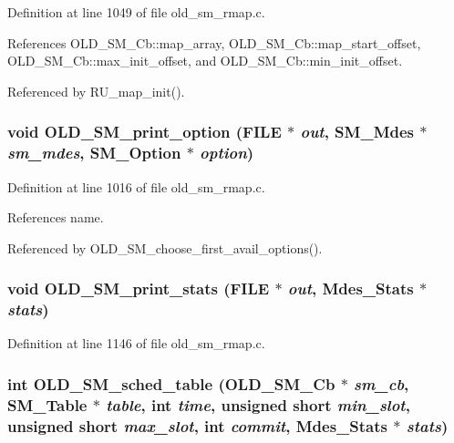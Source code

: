 Definition at line 1049 of file old\_\-sm\_\-rmap.c.

References OLD\_\-SM\_\-Cb::map\_\-array, OLD\_\-SM\_\-Cb::map\_\-start\_\-offset, OLD\_\-SM\_\-Cb::max\_\-init\_\-offset, and OLD\_\-SM\_\-Cb::min\_\-init\_\-offset.

Referenced by RU\_\-map\_\-init().
\subsubsection{\setlength{\rightskip}{0pt plus 5cm}void OLD\_\-SM\_\-print\_\-option (FILE $\ast$ {\em out}, SM\_\-Mdes $\ast$ {\em sm\_\-mdes}, SM\_\-Option $\ast$ {\em option})}\label{old__sm__rmap_8c_76de179c12baa6033e082dd8776988b7}




Definition at line 1016 of file old\_\-sm\_\-rmap.c.

References name.

Referenced by OLD\_\-SM\_\-choose\_\-first\_\-avail\_\-options().
\subsubsection{\setlength{\rightskip}{0pt plus 5cm}void OLD\_\-SM\_\-print\_\-stats (FILE $\ast$ {\em out}, Mdes\_\-Stats $\ast$ {\em stats})}\label{old__sm__rmap_8c_ff6155436294299fda77bc86ed972ae1}




Definition at line 1146 of file old\_\-sm\_\-rmap.c.
\subsubsection{\setlength{\rightskip}{0pt plus 5cm}int OLD\_\-SM\_\-sched\_\-table (\bf{OLD\_\-SM\_\-Cb} $\ast$ {\em sm\_\-cb}, SM\_\-Table $\ast$ {\em table}, int {\em time}, unsigned short {\em min\_\-slot}, unsigned short {\em max\_\-slot}, int {\em commit}, Mdes\_\-Stats $\ast$ {\em stats})}\label{old__sm__rmap_8c_e99a5403da030759f300328c3273fcdf}




